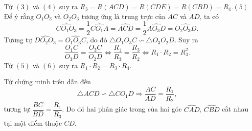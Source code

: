 \begin{bt}
{		Từ $(3)$ và $(4)$ suy ra
		$R_3=R(ACD)=R(CDE)=R(CBD)=R_4$.\hfill$(5)$\\
		Để ý rằng $O_1O_3$ và $O_2O_3$ tương ứng là trung trực của $AC$ và $AD$, ta có
		$$\widehat{CO_1O_3}=\dfrac{1}{2}\widehat{CO_1A}=\widehat{ACD}=\dfrac{1}{2}\widehat{AO_3D}=\widehat{O_2O_3D}.$$
		Tương tự $\widehat{DO_2O_3}=\widehat{O_1O_3C}$, do đó $\triangle O_1O_3C \backsim \triangle O_3O_2D$. Suy ra
		\[\dfrac{O_1C}{O_3D}=\dfrac{O_3C}{O_2D}\Leftrightarrow\dfrac{R_1}{R_3}=\dfrac{R_3}{R_2}\Leftrightarrow R_1\cdot R_2=R_3^2.\tag{6}\]
		Từ $(5)$ và $(6)$ suy ra $R_1\cdot R_2=R_3\cdot R_4$.
		\begin{nx}
			Từ chứng minh trên dẫn đến $$\triangle ACD\backsim \triangle CO_1D \Rightarrow \dfrac{AC}{AD}=\dfrac{R_1}{R_2},$$ tương tự $\dfrac{BC}{BD}=\dfrac{R_1}{R_3}$. Do đó hai phân giác trong của hai góc $\widehat{CAD}$, $\widehat{CBD}$ cắt nhau tại một điểm thuộc $CD$.
		\end{nx}
	}
\end{bt}


